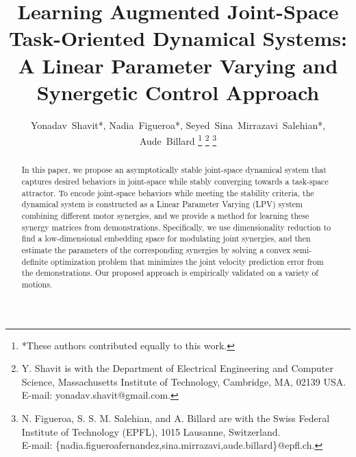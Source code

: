 \documentclass[letterpaper, 10 pt, conference,fleqn]{ieeeconf}
\begin{document}
%
\title{Learning Augmented Joint-Space Task-Oriented Dynamical Systems: \\ A
Linear Parameter Varying and Synergetic Control Approach}


%
%
\author{Yonadav~Shavit*, Nadia~Figueroa*, Seyed~Sina~Mirrazavi~Salehian*, Aude~Billard
\thanks{*These authors contributed equally to this work.}
\thanks{Y. Shavit is with the Department
of Electrical Engineering and Computer Science, Massachusetts Institute of Technology, Cambridge,
MA, 02139 USA. E-mail: yonadav.shavit@gmail.com.}%
\thanks{N. Figueroa, S. S. M. Salehian, and A. Billard are with the Swiss Federal Institute of Technology (EPFL), 1015 Lausanne, Switzerland. \\E-mail: \{nadia.figueroafernandez,sina.mirrazavi,aude.billard\}@epfl.ch.}
}%


\maketitle
\thispagestyle{empty}
\pagestyle{empty}



\begin{abstract}
In this paper, we propose an asymptotically stable joint-space dynamical system that captures desired behaviors in joint-space while stably converging towards a task-space attractor. %
 To encode joint-space behaviors while meeting the stability criteria, the dynamical system is constructed as a Linear Parameter Varying (LPV) system combining different motor synergies, and we provide a method for learning these synergy matrices from demonstrations. Specifically, we use dimensionality reduction to find a low-dimensional embedding space for modulating joint synergies, and then estimate the parameters of the corresponding synergies by solving a convex semi-definite optimization problem that minimizes the joint velocity prediction error from the demonstrations. Our proposed approach is empirically validated on a variety of motions. %
 \end{abstract}
\end{document}
